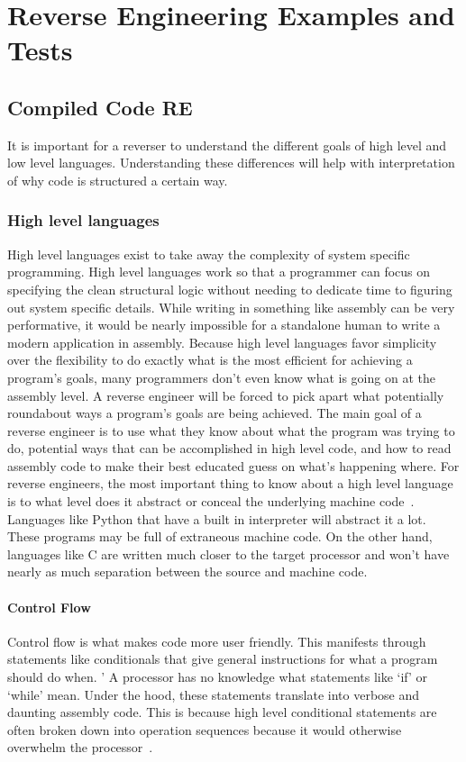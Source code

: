 \chapter{Reverse Engineering Examples and Tests}

\section{Compiled Code RE}
It is important for a reverser to understand the different goals of high level and low level languages. 
Understanding these differences will help with interpretation of why code is structured a certain way.


\subsection{High level languages}
High level languages exist to take away the complexity of system specific programming.
High level languages work so that a programmer can focus on specifying the clean structural logic without needing to dedicate time to figuring out system specific details. 
While writing in something like assembly can be very performative, it would be nearly impossible for a standalone human to write a modern application in assembly.
Because high level languages favor simplicity over the flexibility to do exactly what is the most efficient for achieving a program’s goals, many programmers don’t even know what is going on at the assembly level. 
A reverse engineer will be forced to pick apart what potentially roundabout ways a program’s goals are being achieved. 
The main goal of a reverse engineer is to use what they know about what the program was trying to do, potential ways that can be accomplished in high level code, and how to read assembly code to make their best educated guess on what’s happening where.
For reverse engineers, the most important thing to know about a high level language is to what level does it abstract or conceal the underlying machine code~\cite{Reversing}. 
Languages like Python that have a built in interpreter will abstract it a lot. 
These programs may be full of extraneous machine code. On the other hand, languages like C are written much closer to the target processor and won’t have nearly as much separation between the source and machine code.

\subsubsection{Control Flow}
Control flow is what makes code more user friendly. 
This manifests through statements like conditionals that give general instructions for what a program should do when. '
A processor has no knowledge what statements like ‘if’ or ‘while’ mean. 
Under the hood, these statements translate into verbose and daunting assembly code. 
This is because high level conditional statements are often broken down into operation sequences because it would otherwise overwhelm the processor~\cite{Reversing}.

